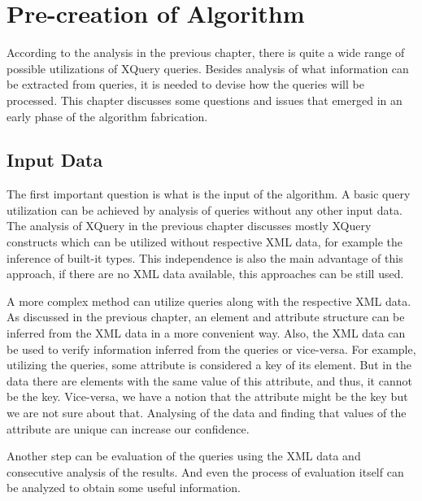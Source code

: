\chapter{Pre-creation of Algorithm}
According to the analysis in the previous chapter, there is quite a wide range of possible utilizations of XQuery queries. Besides analysis of what information can be extracted from queries, it is needed to devise how the queries will be processed. This chapter discusses some questions and issues that emerged in an early phase of the algorithm fabrication.

\section{Input Data}
The first important question is what is the input of the algorithm. A basic query utilization can be achieved by analysis of queries without any other input data. The analysis of XQuery in the previous chapter discusses mostly XQuery constructs which can be utilized without respective XML data, for example the inference of built-it types. This independence is also the main advantage of this approach, if there are no XML data available, this approaches can be still used. 

A more complex method can utilize queries along with the respective XML data. As discussed in the previous chapter, an element and attribute structure can be inferred from the XML data in a more convenient way. Also, the XML data can be used to verify information inferred from the queries or vice-versa. For example, utilizing the queries, some attribute is considered a key of its element. But in the data there are elements with the same value of this attribute, and thus, it cannot be the key. Vice-versa, we have a notion that the attribute might be the key but we are not sure about that. Analysing of the data and finding that values of the attribute are unique can increase our confidence. 

Another step can be evaluation of the queries using the XML data and consecutive analysis of the results. And even the process of evaluation itself can be analyzed to obtain some useful information. 


